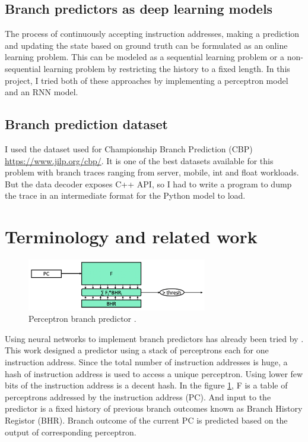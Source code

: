 \documentclass{article}
\begin{document}
\subsection{Branch predictors as deep learning models}

The process of continuously accepting instruction addresses, making a prediction and updating the state based on ground truth can be formulated as an online learning problem. This can be modeled as a sequential learning problem or a non-sequential learning problem by restricting the history to a fixed length. In this project, I tried both of these approaches by implementing a perceptron model and an RNN model.

\subsection{Branch prediction dataset}

I used the dataset used for Championship Branch Prediction (CBP) \url{https://www.jilp.org/cbp/}. It is one of the best datasets available for this problem with branch traces ranging from server, mobile, int and float workloads. But the data decoder exposes C++ API, so I had to write a program to dump the trace in an intermediate format for the Python model to load.

\section{Terminology and related work}

\begin{figure}
  \centering
  \includegraphics[width=0.7\textwidth]{perceptron.png}
  \caption{Perceptron branch predictor \cite{CezeClass}.}
  \label{fig:perceptron}
\end{figure}

Using neural networks to implement branch predictors has already been tried by \cite{Jimnez2000DynamicBP}. This work designed a predictor using a stack of perceptrons each for one instruction address. Since the total number of instruction addresses is huge, a hash of instruction address is used to access a unique perceptron. Using lower few bits of the instruction address is a decent hash. In the figure \ref{fig:perceptron}, F is a table of perceptrons addressed by the instruction address (PC). And input to the predictor is a fixed history of previous branch outcomes known as Branch History Registor (BHR). Branch outcome of the current PC is predicted based on the output of corresponding perceptron.
\end{document}
